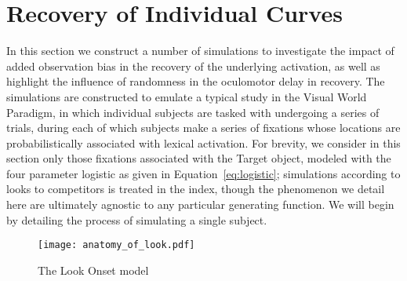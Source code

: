 \section{Recovery of Individual Curves}\label{sec:ind_curves}



In this section we construct a number of simulations to investigate the impact of added observation bias in the recovery of the underlying activation, as well as highlight the influence of randomness in the oculomotor delay in recovery. The simulations are constructed to emulate a typical study in the Visual World Paradigm, in which individual subjects are tasked with undergoing a series of trials, during each of which subjects make a series of fixations whose locations are probabilistically associated with lexical activation. For brevity, we consider in this section only those fixations associated with the Target object, modeled with the four parameter logistic as given in Equation~\ref{eq:logistic}; simulations according to looks to competitors is treated in the index, though the phenomenon we detail here are ultimately agnostic to any particular generating function. We will begin by detailing the process of simulating a single subject. 


\begin{figure}[H]
\centering
\texttt{[image: anatomy\_of\_look.pdf]}
\caption{The Look Onset model}
\label{fig:anatomy_of_look}
\end{figure}


